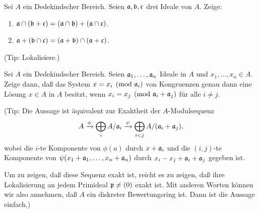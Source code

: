 \begin{exercise}
	Sei \(A\) ein Dedekindscher Bereich. Seien \(\mathfrak{a}, \mathfrak{b}, \mathfrak{c}\)
	drei Ideale von \(A\). Zeige:
	\begin{enumerate}
	\item
		\(\mathfrak{a} \cap (\mathfrak{b} + \mathfrak{c}) = (\mathfrak{a} \cap \mathfrak{b})
		+ (\mathfrak{a} \cap \mathfrak{c})\).
	\item
		\(\mathfrak{a} + (\mathfrak{b} \cap \mathfrak{c}) = (\mathfrak{a} + \mathfrak{b})
		\cap (\mathfrak{a} + \mathfrak{c})\).
	\end{enumerate}
	
	(Tip: Lokalisiere.)
\end{exercise}

\begin{exercise}
	Sei \(A\) ein Dedekindscher Bereich. Seien \(\mathfrak{a}_1, \dotsc, \mathfrak{a}_n\)
	Ideale in \(A\) und \(x_1, \dotsc, x_n \in A\). Zeige dann, daß das
	System \(x = x_i \pmod{\mathfrak{a}_i}\) von Kongruenzen genau dann eine Lösung \(x \in A\)
	in \(A\) besitzt, wenn \(x_i = x_j \pmod{\mathfrak{a}_i + \mathfrak{a}_j}\) für alle
	\(i \neq j\).
	
	(Tip: Die Aussage ist äquivalent zur Exaktheit der \(A\)-Modulsequenz
	\[
		A \xrightarrow{\phi} \bigoplus\limits_i A/\mathfrak{a}_i
		\xrightarrow{\psi} \bigoplus\limits_{i < j} A/(\mathfrak{a}_i + \mathfrak{a}_j),
	\]
	wobei die \(i\)-te Komponente von \(\phi(a)\) durch \(x + \mathfrak{a}_i\) und
	die \((i, j)\)-te Komponente von \(\psi(x_1 + \mathfrak{a}_1, \dotsc,
	x_n + \mathfrak{a}_n)\) durch \(x_i - x_j + \mathfrak{a}_i + \mathfrak{a}_j\) gegeben ist.
	
	Um zu zeigen, daß diese Sequenz exakt ist, reicht es zu zeigen, daß ihre
	Lokalisierung an jedem Primideal \(\mathfrak{p} \neq (0)\) exakt ist. Mit anderen
	Worten können wir also annehmen, daß \(A\) ein diskreter Bewertungsring ist.
	Dann ist die Aussage einfach.)
\end{exercise}

